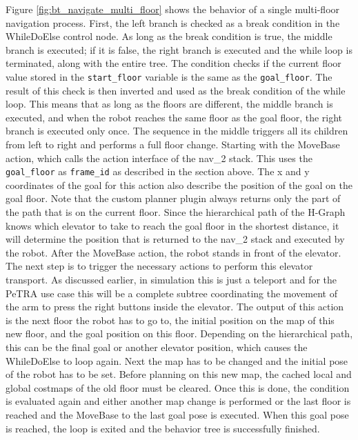Figure \ref{fig:bt_navigate_multi_floor} shows the behavior of a single multi-floor navigation process. First, the left branch is checked as a break condition in the WhileDoElse control node. As long as the break condition is true, the middle branch is executed; if it is false, the right branch is executed and the while loop is terminated, along with the entire tree. The condition checks if the current floor value stored in the \texttt{start\_floor} variable is the same as the \texttt{goal\_floor}. The result of this check is then inverted and used as the break condition of the while loop. This means that as long as the floors are different, the middle branch is executed, and when the robot reaches the same floor as the goal floor, the right branch is executed only once. The sequence in the middle triggers all its children from left to right and performs a full floor change. Starting with the MoveBase action, which calls the action interface of the \gls{nav_2} stack. This uses the \texttt{goal\_floor} as \texttt{frame\_id} as described in the section above. The x and y coordinates of the goal for this action also describe the position of the goal on the goal floor. Note that the custom planner plugin always returns only the part of the path that is on the current floor. Since the hierarchical path of the H-Graph knows which elevator to take to reach the goal floor in the shortest distance, it will determine the position that is returned to the \gls{nav_2} stack and executed by the robot. After the MoveBase action, the robot stands in front of the elevator. The next step is to trigger the necessary actions to perform this elevator transport. As discussed earlier, in simulation this is just a teleport and for the PeTRA use case this will be a complete subtree coordinating the movement of the arm to press the right buttons inside the elevator. The output of this action is the next floor the robot has to go to, the initial position on the map of this new floor, and the goal position on this floor. Depending on the hierarchical path, this can be the final goal or another elevator position, which causes the WhileDoElse to loop again. Next the map has to be changed and the initial pose of the robot has to be set. Before planning on this new map, the cached local and global costmaps of the old floor must be cleared. Once this is done, the condition is evaluated again and either another map change is performed or the last floor is reached and the MoveBase to the last goal pose is executed. When this goal pose is reached, the loop is exited and the behavior tree is successfully finished.
